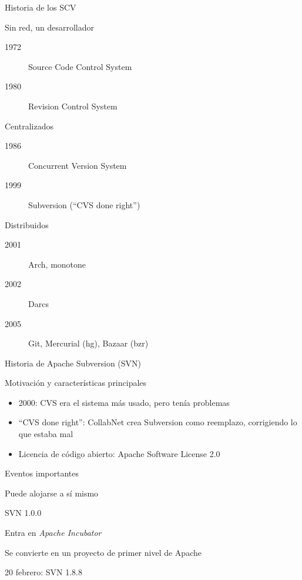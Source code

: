\documentclass[xcolor=svgnames]{beamer}
\begin{document}
\begin{frame}{Historia de los SCV}

  \begin{block}{Sin red, un desarrollador}
    \begin{description}
    \item[1972] Source Code Control System
    \item[1980] Revision Control System
    \end{description}
  \end{block}

  \begin{block}{Centralizados}
    \begin{description}
    \item[1986] Concurrent Version System
    \item[1999] Subversion (\enquote{CVS done right})
    \end{description}
  \end{block}

  \begin{block}{Distribuidos}
    \begin{description}
    \item[2001] Arch, monotone
    \item[2002] Darcs
    \item[2005] Git, Mercurial (hg), Bazaar (bzr)
    \end{description}
  \end{block}

\end{frame}

\begin{frame}{Historia de Apache Subversion (SVN)}

  \begin{block}{Motivación y características principales}
    \begin{itemize}
    \item 2000: CVS era el sistema más usado, pero tenía problemas
    \item ``CVS done right'': CollabNet crea Subversion como
      reemplazo, corrigiendo lo que estaba mal
    \item Licencia de código abierto: Apache Software License 2.0
    \end{itemize}
  \end{block}

  \begin{block}{Eventos importantes}
    \begin{description}[2001]
    \item[2001] Puede alojarse a sí mismo
    \item[2004] SVN 1.0.0
    \item[2009] Entra en \emph{Apache Incubator}
    \item[2010] Se convierte en un proyecto de primer nivel de Apache
    \item[2014] 20 febrero: SVN 1.8.8
    \end{description}
  \end{block}

\end{frame}
\end{document}
